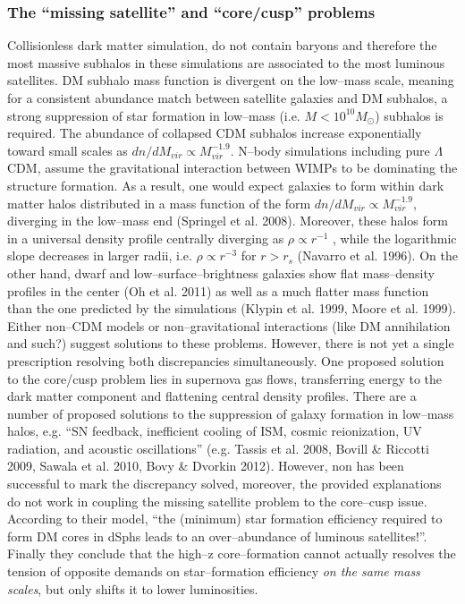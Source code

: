 \documentclass[paper=a4, fontsize=11pt]{scrartcl} %
\numberwithin{equation}{section} %
\numberwithin{figure}{section} %
\numberwithin{table}{section} %
\begin{document}
\subsubsection*{The ``missing satellite'' and ``core/cusp'' problems}
Collisionless dark matter simulation, do not contain baryons and therefore the most massive subhalos in these simulations are associated to the most luminous satellites. DM subhalo mass function is divergent on the low--mass scale, meaning for a consistent abundance match between satellite galaxies and DM subhalos, a strong suppression of star formation in low--mass (i.e. $M<10^{10} M_\odot$) subhalos is required. 
The abundance of collapsed CDM subhalos increase exponentially toward small scales as $dn/dM_{vir} \propto M_{vir}^{-1.9}$.
N--body simulations including pure $\Lambda$CDM, assume the gravitational interaction between WIMPs to be dominating the structure formation. As a result, one would expect galaxies to form within dark matter halos distributed in a mass function of the form $dn/dM_{vir} \propto M_{vir}^{-1.9}$, diverging in the low--mass end (Springel et al. 2008). Moreover, these halos form in a universal density profile centrally diverging as $\rho \propto r^{-1}$ , while the logarithmic slope decreases in larger radii, i.e. $\rho \propto r^{-3}$ for $r>r_s$ ({Navarro et al. 1996}). On the other hand, dwarf and low--surface--brightness galaxies show flat mass--density profiles in the center ({Oh et al. 2011}) as well as a much flatter mass function than the one predicted by the simulations ({Klypin et al. 1999, Moore et al. 1999}). Either non--CDM models or non--gravitational interactions (like DM annihilation and such?) suggest solutions to these problems. However, there is not yet a single prescription resolving both discrepancies simultaneously. One proposed solution to the core/cusp problem lies in supernova gas flows, transferring energy to the dark matter component and flattening central density profiles. There are a number of proposed solutions to the suppression of galaxy formation in low--mass halos, e.g. ``SN feedback, inefficient cooling of ISM, cosmic reionization, UV radiation, and acoustic oscillations'' (e.g. Tassis et al. 2008, Bovill \& Riccotti 2009, Sawala et al. 2010, Bovy \& Dvorkin 2012). However, non has been successful to mark the discrepancy solved, moreover, the provided explanations do not work in coupling the missing satellite problem to the core--cusp issue. According to their model, ``the (minimum) star formation efficiency required to form DM cores in dSphs leads to an over--abundance of luminous satellites!''. Finally they conclude that the high--z core--formation cannot actually resolves the tension of opposite demands on star--formation efficiency \emph{on the same mass scales}, but only shifts it to lower luminosities.
\end{document}
